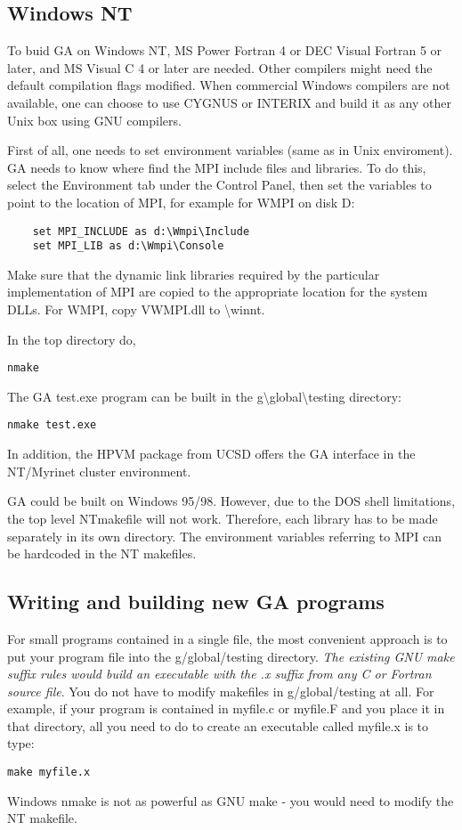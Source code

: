 \subsection{Windows NT }

To buid GA on Windows NT, MS Power Fortran 4 or DEC Visual Fortran
5 or later, and MS Visual C 4 or later are needed. Other compilers
might need the default compilation flags modified. When commercial
Windows compilers are not available, one can choose to use CYGNUS
or INTERIX and build it as any other Unix box using GNU compilers.

First of all, one needs to set environment variables (same as in Unix
enviroment). GA needs to know where find the MPI include files and
libraries. To do this, select the Environment tab under the Control
Panel, then set the variables to point to the location of MPI, for
example for WMPI on disk D:
\begin{verbatim}
    set MPI_INCLUDE as d:\Wmpi\Include
    set MPI_LIB as d:\Wmpi\Console
\end{verbatim}
Make sure that the dynamic link libraries required by the particular
implementation of MPI are copied to the appropriate location for the
system DLLs. For WMPI, copy VWMPI.dll to \textbackslash{}winnt.

In the top directory do,
\begin{verbatim}
nmake
\end{verbatim}
The GA test.exe program can be built in the g\textbackslash{}global\textbackslash{}testing
directory:
\begin{verbatim}
nmake test.exe
\end{verbatim}
In addition, the HPVM package from UCSD offers the GA interface in
the NT/Myrinet cluster environment.

GA could be built on Windows 95/98. However, due to the DOS shell
limitations, the top level NTmakefile will not work. Therefore, each
library has to be made separately in its own directory. The environment
variables referring to MPI can be hardcoded in the NT makefiles.


\subsection{Writing and building new GA programs}

For small programs contained in a single file, the most convenient
approach is to put your program file into the g/global/testing directory.
\emph{The existing GNU make suffix rules would build an executable
with the \textquotedbl{}.x\textquotedbl{} suffix from any C or Fortran
source file}. You do not have to modify makefiles in g/global/testing
at all. For example, if your program is contained in myfile.c or myfile.F
and you place it in that directory, all you need to do to create an
executable called myfile.x is to type: 
\begin{verbatim}
make myfile.x
\end{verbatim}
Windows nmake is not as powerful as GNU make - you would need to modify
the NT makefile.

